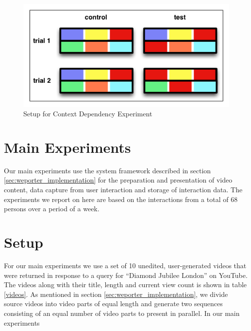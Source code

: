 \begin{figure}[htbp]
  \centering
    \includegraphics[width = .7\textwidth]{img/exp_context}
  \caption{Setup for Context Dependency Experiment}
  \label{fig:exp_context}
\end{figure}





\section{Main Experiments} %
\label{sec:main_experiments}

Our main experiments use the system framework described in section \ref{sec:weporter_implementation} for the preparation and presentation of video content, data capture from user interaction and storage of interaction data. The experiments we report on here are based on the interactions from a total of 68 persons over a period of a week.

\section{Setup}
For our main experiments we use a set of 10 unedited, user-generated videos that were returned in response to a query for ``Diamond Jubilee London'' on YouTube. The videos along with their title, length and current view count is shown in table \ref{videos}. As mentioned in section \ref{sec:weporter_implementation}, we divide source videos into video parts of equal length and generate two sequences consisting of an equal number of video parts to present in parallel. In our main experiments 

